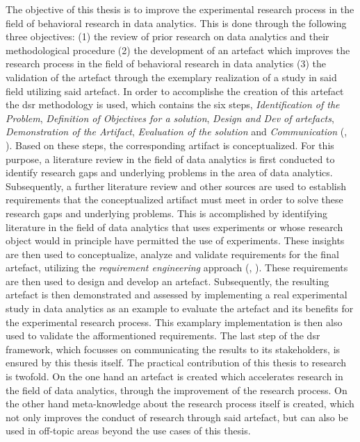 The objective of this thesis is to improve the experimental research process in the field of behavioral research in data analytics. This is done through the following three objectives: (1) the review of prior research on data analytics and their methodological procedure (2) the development of an artefact which improves the research process in the field of behavioral research in data analytics (3) the validation of the artefact through the exemplary realization of a study in said field utilizing said artefact. In order to accomplishe the creation of this artefact the \ac{dsr} methodology is used, which contains the six steps, \textit{Identification of the Problem}, \textit{Definition of Objectives for a solution}, \textit{Design and Dev of artefacts}, \textit{Demonstration of the Artifact}, \textit{Evaluation of the solution} and \textit{Communication} (\cite{Peffers.2006}, \cite{Dresch.2015}). Based on these steps, the corresponding artifact is conceptualized. For this purpose, a literature review in the field of data analytics is first conducted to identify research gaps and underlying problems in the area of data analytics. Subsequently, a further literature review and other sources are used to establish requirements that the conceptualized artifact must meet in order to solve these research gaps and underlying problems. This is accomplished by identifying literature in the field of data analytics that uses experiments or whose research object would in principle have permitted the use of experiments. These insights are then used to conceptualize, analyze and validate requirements for the final artefact, utilizing the \textit{requirement engineering} approach (\cite{Sommerville.2011}, \cite{SWEBOK.2004}). These requirements are then used to design and develop an artefact. Subsequently, the resulting artefact is then demonstrated and assessed by implementing a real experimental study in data analytics as an example to evaluate the artefact and its benefits for the experimental research process. This examplary implementation is then also used to validate the afformentioned requirements. The last step of the \ac{dsr} framework, which focusses on communicating the results to its stakeholders, is ensured by this thesis itself. The practical contribution of this thesis to research is twofold. On the one hand an artefact is created which accelerates research in the field of data analytics, through the improvement of the research process. On the other hand meta-knowledge about the research process itself is created, which not only improves the conduct of research through said artefact, but can also be used in off-topic areas beyond the use cases of this thesis.


